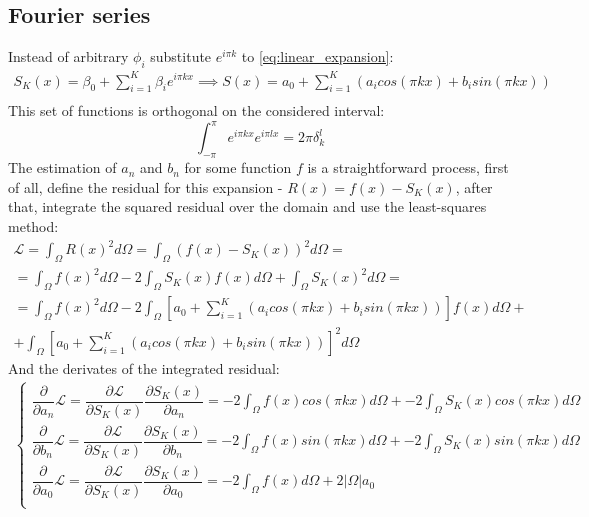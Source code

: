 \subsection{Fourier series}
Instead of arbitrary $\phi_i$ substitute $e^{i \pi k}$ to \eqref{eq:linear_expansion}:
\begin{equation*}
	\begin{multlined}
		S_K(x) = \beta_0 + \sum_{i = 1}^K \beta_i e^{i \pi k x} \implies S(x) = a_0 + \sum_{i = 1}^K \left (a_i cos(\pi k x) + b_i sin(\pi k x) \right ) \\
	\end{multlined}
\end{equation*}
This set of functions is orthogonal on the considered interval:
\begin{equation*} 
	\int_{-\pi}^{\pi} e^{i \pi k x} e^{i \pi l x} = 2\pi \delta_k^l 
\end{equation*}
The estimation of $a_n$ and $b_n$ for some function $f$ is a straightforward process, first of all, define the residual for this expansion - $R(x) = f(x) - S_K(x)$, after that, integrate the squared residual over the domain and use the least-squares method:
\begin{equation*}
	\begin{multlined}
		\mathcal{L} = \int_{\Omega} R(x)^2 d\Omega = \int_{\Omega} \left ( f(x) - S_K(x) \right )^2 d\Omega = \\ = \int_{\Omega} f(x)^2 d\Omega - 2 \int_{\Omega} S_K(x) f(x) d\Omega + \int_{\Omega} S_K(x)^2 d\Omega = \\ = \int_{\Omega} f(x)^2 d\Omega - 2 \int_{\Omega} \left [ a_0 + \sum_{i = 1}^K \left (a_i cos(\pi k x) + b_i sin(\pi k x) \right ) \right ] f(x) d\Omega + \\ +  \int_{\Omega} \left [ a_0 + \sum_{i = 1}^K \left (a_i cos(\pi k x) + b_i sin(\pi k x) \right ) \right ]^2 d\Omega
	\end{multlined}
\end{equation*}
And the derivates of the integrated residual:
\begin{equation}
 	\begin{multlined}
 		\begin{cases}
 			\dfrac{\partial }{\partial a_n} \mathcal{L} = \dfrac{\partial \mathcal{L}}{\partial S_K(x)} \dfrac{\partial S_K(x)}{\partial a_n}  = -2 {\displaystyle \int_{\Omega}} f(x) cos(\pi k x) d\Omega + -2 {\displaystyle \int_{\Omega}} S_K(x) cos(\pi k x) d\Omega \\[20pt]
 			\dfrac{\partial }{\partial b_n} \mathcal{L} = \dfrac{\partial \mathcal{L}}{\partial S_K(x)} \dfrac{\partial S_K(x)}{\partial b_n} = -2 {\displaystyle \int_{\Omega}} f(x) sin(\pi k x) d\Omega + -2 {\displaystyle \int_{\Omega}} S_K(x) sin(\pi k x) d\Omega \\[20pt]
 			\dfrac{\partial }{\partial a_0} \mathcal{L} = \dfrac{\partial \mathcal{L}}{\partial S_K(x)} \dfrac{\partial S_K(x)}{\partial a_0}  = -2 {\displaystyle \int_{\Omega}} f(x) d\Omega + 2 |\Omega| a_0 \\[20pt]
 		\end{cases}
 	\end{multlined}
\end{equation}

